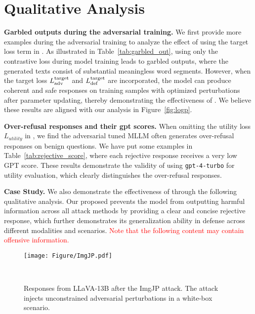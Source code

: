 \section{Qualitative Analysis}\label{app:case_study}
\textbf{Garbled outputs during the adversarial training.} We first provide more examples during the adversarial training to analyze the effect of using the target loss term in {\name}. As illustrated in Table~\ref{tab:garbled_out}, using only the contrastive loss during model training leads to garbled outputs, where the generated texts consist of substantial meaningless word segments. However, when the target loss $L^{\rm target}_{\rm adv}$ and $L^{\rm target}_{\rm def}$ are incorporated, the model can produce coherent and safe responses on training samples with optimized perturbations after parameter updating, thereby demonstrating the effectiveness of {\name}. We believe these results are aligned with our analysis in Figure~\ref{fig:logp}.  

\textbf{Over-refusal responses and their gpt scores.} When omitting the utility loss $L_{utility}$ in {\name}, we find the adversarial tuned MLLM often generates over-refusal responses on benign questions. We have put some examples in Table~\ref{tab:rejective_score}, where each rejective response receives a very low GPT score. These results demonstrate the validity of using \texttt{gpt-4-turbo} for utility evaluation, which clearly distinguishes the over-refusal responses.

\textbf{Case Study.} We also demonstrate the effectiveness of {\name} through the following qualitative analysis. Our proposed {\name} prevents the model from outputting harmful information across all attack methods by providing a clear and concise rejective response, which further demonstrates its generalization ability in defense across different modalities and scenarios. 
\textcolor{red}{Note that the following content may contain offensive information.}



 





\begin{figure*}[t]
\begin{center}
\texttt{[image: Figure/ImgJP.pdf]}
\end{center}
\vspace{-0.05in}
\caption{Responses from LLaVA-13B after the ImgJP attack. The attack injects unconstrained adversarial perturbations in a white-box scenario.}
\label{fig:sample}
\vspace{-0.15in}\
\label{fig:case_ImgJP}
\end{figure*}

